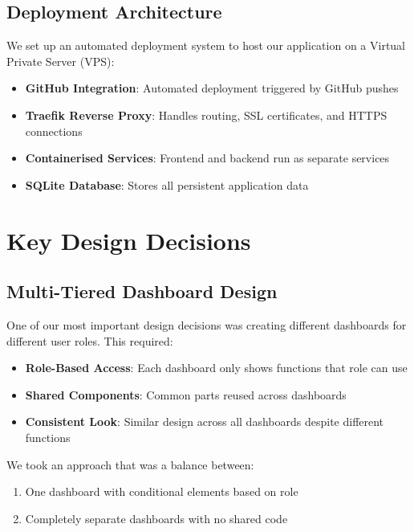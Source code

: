 \subsection{Deployment Architecture}

We set up an automated deployment system to host our application on a Virtual Private Server (VPS):

\begin{itemize}
    \item \textbf{GitHub Integration}: Automated deployment triggered by GitHub pushes
    \item \textbf{Traefik Reverse Proxy}: Handles routing, SSL certificates, and HTTPS connections
    \item \textbf{Containerised Services}: Frontend and backend run as separate services
    \item \textbf{SQLite Database}: Stores all persistent application data
\end{itemize}

\section{Key Design Decisions}

\subsection{Multi-Tiered Dashboard Design}

One of our most important design decisions was creating different dashboards for different user roles. This required:

\begin{itemize}
    \item \textbf{Role-Based Access}: Each dashboard only shows functions that role can use
    \item \textbf{Shared Components}: Common parts reused across dashboards
    \item \textbf{Consistent Look}: Similar design across all dashboards despite different functions
\end{itemize}

We took an approach that was a balance between:

\begin{enumerate}
    \item One dashboard with conditional elements based on role
    \item Completely separate dashboards with no shared code
\end{enumerate}


